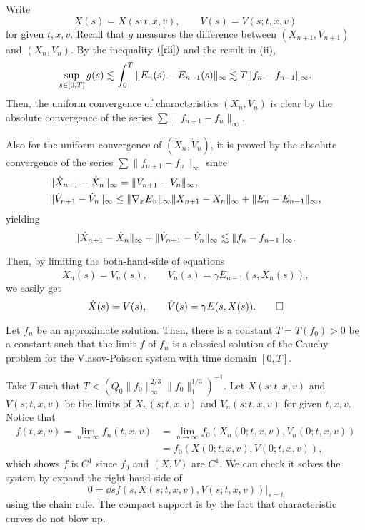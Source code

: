 \documentclass[11pt]{amsart}
\begin{document}
\begin{pfs}
\item
Write
\[X(s)=X(s;t,x,v),\qquad V(s)=V(s;t,x,v)\]
for given $t,x,v$.
Recall that $g$ measures the difference between $(X_{n+1},V_{n+1})$ and $(X_n,V_n)$.
By the inequality $(\ref{rii})$ and the result in (ii),
\begin{align*}
\sup_{s\in[0,T]}g(s)\lesssim\int_0^T\|E_n(s)-E_{n-1}(s)\|_\infty\lesssim T\|f_n-f_{n-1}\|_\infty.
\end{align*}
Then, the uniform convergence of characteristics $(X_n,V_n)$ is clear by the absolute convergence of the series $\sum\|f_{n+1}-f_n\|_\infty$.

Also for the uniform convergence of $(\dot X_n,\dot V_n)$, it is proved by the absolute convergence of the series $\sum\|f_{n+1}-f_n\|_\infty$ since
\begin{align*}
&\|\dot X_{n+1}-\dot X_n\|_\infty=\|V_{n+1}-V_n\|_\infty,\\
&\|\dot V_{n+1}-\dot V_n\|_\infty\le\|\nabla_xE_n\|_\infty\|X_{n+1}-X_n\|_\infty+\|E_n-E_{n-1}\|_\infty,
\end{align*}
yielding
\[\|\dot X_{n+1}-\dot X_n\|_\infty+\|\dot V_{n+1}-\dot V_n\|_\infty\lesssim\|f_n-f_{n-1}\|_\infty.\]

Then, by limiting the both-hand-side of equations
\[\dot X_n(s)=V_n(s),\qquad \dot V_n(s)=\gamma E_{n-1}(s,X_n(s)),\]
we easily get
\[\dot X(s)=V(s),\qquad \dot V(s)=\gamma E(s,X(s)).\qedhere\]
\end{pfs}

\begin{thm}
Let $f_n$ be an approximate solution.
Then, there is a constant $T=T(f_0)>0$ be a constant such that the limit $f$ of $f_n$ is a classical solution of the Cauchy problem for the Vlasov-Poisson system with time domain $[0,T]$.
\end{thm}
\begin{pf}
Take $T$ such that $T<(Q_0\|f_0\|_\infty^{2/3}\|f_0\|_1^{1/3})^{-1}$.
Let $X(s;t,x,v)$ and $V(s;t,x,v)$ be the limits of $X_n(s;t,x,v)$ and $V_n(s;t,x,v)$ for given $t,x,v$.
Notice that
\begin{align*}
f(t,x,v)=\lim_{n\to\infty}f_n(t,x,v)&=\lim_{n\to\infty}f_0(X_n(0;t,x,v),V_n(0;t,x,v))\\
&=f_0(X(0;t,x,v),V(0;t,x,v)),
\end{align*}
which shows $f$ is $C^1$ since $f_0$ and $(X,V)$ are $C^1$.
We can check it solves the system by expand the right-hand-side of
\[0=\dd{s}f(s,X(s;t,x,v),V(s;t,x,v))|_{s=t}\]
using the chain rule.
The compact support is by the fact that characteristic curves do not blow up.
\end{pf}
\end{document}
